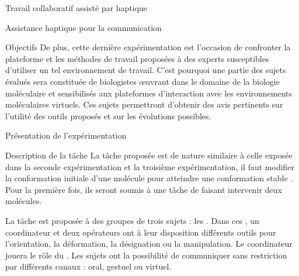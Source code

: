 \documentclass[myfrancais,ngerman,english,french]{mythesis}
\begin{document}
\begin{mychapter}{Travail collaboratif assisté par haptique}
\begin{mysection}{Assistance haptique pour la communication}
\begin{mysubsection}{Objectifs}
				De plus, cette dernière expérimentation est l'occasion de confronter la plateforme et les méthodes de travail proposées à des experts susceptibles d'utiliser un tel environnement de travail.
				C'est pourquoi une partie des sujets évalués sera constituée de biologistes œuvrant dans le domaine de la biologie moléculaire et sensibilisés aux plateformes d'interaction avec les environnements moléculaires virtuels.
				Ces sujets permettront d'obtenir des avis pertinents sur l'utilité des outils proposés et sur les évolutions possibles.
			\end{mysubsection}
		\end{mysection}
		\begin{mysection}{Présentation de l'expérimentation}
			\begin{mysubsection}{Description de la tâche}
				La tâche proposée est de nature similaire à celle exposée dans la seconde expérimentation et la troisième expérimentation, il faut modifier la conformation initiale d'une molécule pour atteindre une conformation stable .
				Pour la première fois, ils seront soumis à une tâche de  faisant intervenir deux molécules.

				La tâche est proposée à des groupes de trois sujets : les .
				Dans ces , un \og coordinateur \fg et deux \og opérateurs \fg ont à leur disposition différents outils pour l'orientation, la déformation, la désignation ou la manipulation.
				Le coordinateur jouera le rôle du .
				Les sujets ont la possibilité de communiquer sans restriction par différents canaux : oral, gestuel ou virtuel.


\end{mysubsection}
\end{mysection}
\end{mychapter}
\end{document}
